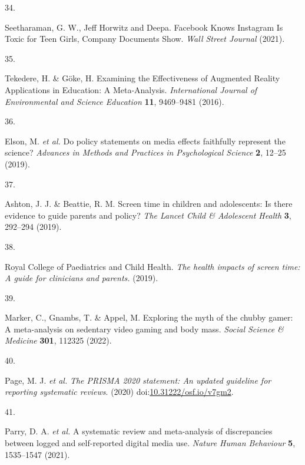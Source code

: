 \documentclass[
  english,
  man]{apa6}
\newlength{\cslhangindent}
\newlength{\csllabelwidth}
\newenvironment{CSLReferences}[2] %
 {%
  \setlength{\parindent}{0pt}
  \ifodd #1 \everypar{\setlength{\hangindent}{\cslhangindent}}\ignorespaces\fi
  \ifnum #2 > 0
  \setlength{\parskip}{#2\baselineskip}
  \fi
 }%
 {}
\newcommand{\CSLLeftMargin}[1]{\parbox[t]{\csllabelwidth}{#1}}
\newcommand{\CSLRightInline}[1]{\parbox[t]{\linewidth - \csllabelwidth}{#1}\break}
\begin{document}
\begin{CSLReferences}{0}{0}
\leavevmode{}%
\CSLLeftMargin{34. }
\CSLRightInline{Seetharaman, G. W., Jeff Horwitz and Deepa. Facebook {Knows Instagram Is Toxic} for {Teen Girls}, {Company Documents Show}. \emph{Wall Street Journal} (2021).}

\leavevmode{}%
\CSLLeftMargin{35. }
\CSLRightInline{Tekedere, H. \& Göke, H. Examining the {Effectiveness} of {Augmented Reality Applications} in {Education}: {A Meta-Analysis}. \emph{International Journal of Environmental and Science Education} \textbf{11}, 9469--9481 (2016).}

\leavevmode{}%
\CSLLeftMargin{36. }
\CSLRightInline{Elson, M. \emph{et al.} Do policy statements on media effects faithfully represent the science? \emph{Advances in Methods and Practices in Psychological Science} \textbf{2}, 12--25 (2019).}

\leavevmode{}%
\CSLLeftMargin{37. }
\CSLRightInline{Ashton, J. J. \& Beattie, R. M. Screen time in children and adolescents: Is there evidence to guide parents and policy? \emph{The Lancet Child \& Adolescent Health} \textbf{3}, 292--294 (2019).}

\leavevmode{}%
\CSLLeftMargin{38. }
\CSLRightInline{Royal College of Paediatrics and Child Health. \emph{The health impacts of screen time: {A} guide for clinicians and parents.} (2019).}

\leavevmode{}%
\CSLLeftMargin{39. }
\CSLRightInline{Marker, C., Gnambs, T. \& Appel, M. Exploring the myth of the chubby gamer: {A} meta-analysis on sedentary video gaming and body mass. \emph{Social Science \& Medicine} \textbf{301}, 112325 (2022).}

\leavevmode{}%
\CSLLeftMargin{40. }
\CSLRightInline{Page, M. J. \emph{et al.} \emph{The {PRISMA} 2020 statement: An updated guideline for reporting systematic reviews}. (2020) doi:\href{https://doi.org/10.31222/osf.io/v7gm2}{10.31222/osf.io/v7gm2}.}

\leavevmode{}%
\CSLLeftMargin{41. }
\CSLRightInline{Parry, D. A. \emph{et al.} A systematic review and meta-analysis of discrepancies between logged and self-reported digital media use. \emph{Nature Human Behaviour} \textbf{5}, 1535--1547 (2021).}


\end{CSLReferences}
\end{document}
